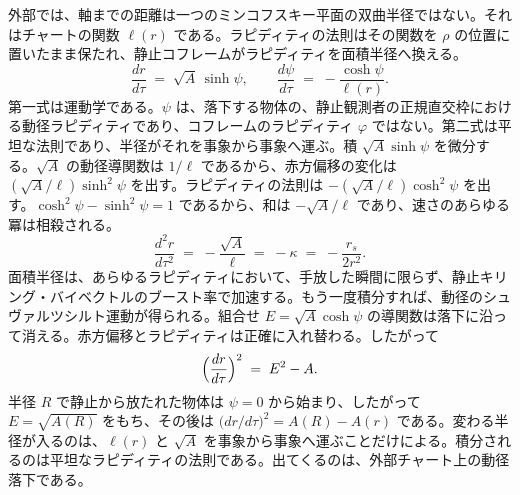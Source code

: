 \documentclass[a4paper]{article}
\begin{document}
外部では、軸までの距離は一つのミンコフスキー平面の双曲半径ではない。それはチャートの関数 \(\ell(r)\) である。ラピディティの法則はその関数を \(\rho\) の位置に置いたまま保たれ、静止コフレームがラピディティを面積半径へ換える。
\begin{equation}
\frac{dr}{d\tau} \;=\; \sqrt{A}\,\sinh\psi,
\qquad
\frac{d\psi}{d\tau} \;=\; -\frac{\cosh\psi}{\ell(r)}.
\label{eq:fall-rapidity}
\end{equation}
第一式は運動学である。\(\psi\) は、落下する物体の、静止観測者の正規直交枠における動径ラピディティであり、コフレームのラピディティ \(\varphi\) ではない。第二式は平坦な法則であり、半径がそれを事象から事象へ運ぶ。積 \(\sqrt{A}\sinh\psi\) を微分する。\(\sqrt{A}\) の動径導関数は \(1/\ell\) であるから、赤方偏移の変化は \((\sqrt{A}/\ell)\sinh^{2}\psi\) を出す。ラピディティの法則は \(-(\sqrt{A}/\ell)\cosh^{2}\psi\) を出す。\(\cosh^{2}\psi-\sinh^{2}\psi=1\) であるから、和は \(-\sqrt{A}/\ell\) であり、速さのあらゆる冪は相殺される。
\begin{equation}
\frac{d^{2}r}{d\tau^{2}} \;=\; -\frac{\sqrt{A}}{\ell} \;=\; -\kappa \;=\; -\frac{r_{s}}{2r^{2}}.
\label{eq:areal-accel}
\end{equation}
面積半径は、あらゆるラピディティにおいて、手放した瞬間に限らず、静止キリング・バイベクトルのブースト率で加速する。もう一度積分すれば、動径のシュヴァルツシルト運動が得られる。組合せ \(E=\sqrt{A}\cosh\psi\) の導関数は落下に沿って消える。赤方偏移とラピディティは正確に入れ替わる。したがって
\begin{equation}
\Bigl(\frac{dr}{d\tau}\Bigr)^{2} \;=\; E^{2}-A.
\label{eq:radial-energy}
\end{equation}
半径 \(R\) で静止から放たれた物体は \(\psi=0\) から始まり、したがって \(E=\sqrt{A(R)}\) をもち、その後は \(\bigl(dr/d\tau\bigr)^{2}=A(R)-A(r)\) である。変わる半径が入るのは、\(\ell(r)\) と \(\sqrt{A}\) を事象から事象へ運ぶことだけによる。積分されるのは平坦なラピディティの法則である。出てくるのは、外部チャート上の動径落下である。
\end{document}
